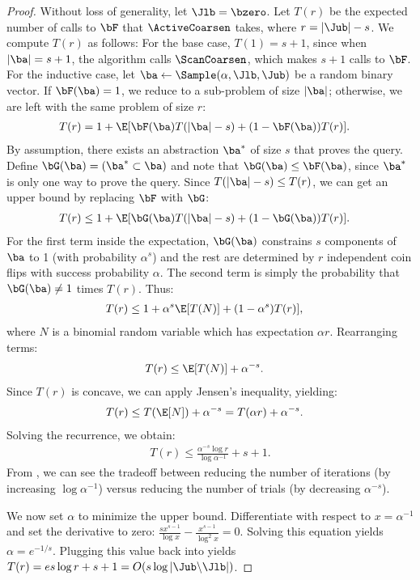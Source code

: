 \begin{proof}
Without loss of generality, let $\Jlb = \bzero$.
Let $T(r)$ be the expected number of calls to $\bF$
that $\ActiveCoarsen$ takes, where $r = |\Jub| - s$.
We compute $T(r)$ as follows:
For the base case, $T(1) = s+1$,
since when $|\ba| = s+1$, the algorithm calls $\ScanCoarsen$, which makes $s+1$ calls to $\bF$.
For the inductive case,
let $\ba \leftarrow \Sample(\alpha, \Jlb, \Jub)$ be a random binary vector.
If $\bF(\ba) = 1$, we reduce to a sub-problem of size $|\ba|$;
otherwise, we are left with the same problem of size $r$:
\begin{align}
T(r) &= 1 + \E[\bF(\ba) T(|\ba|-s) + (1-\bF(\ba)) T(r)].
\end{align}
By assumption, there exists an abstraction $\ba^*$ of size $s$ that proves the query.
Define $\bG(\ba) = (\ba^* \subset \ba)$ and note that $\bG(\ba) \le \bF(\ba)$,
since $\ba^*$ is only one way to prove the query.
Since $T(|\ba|-s) \le T(r)$,
we can get an upper bound by replacing $\bF$ with $\bG$:
\begin{align}
T(r) &\le 1 + \E[\bG(\ba) T(|\ba|-s) + (1-\bG(\ba)) T(r)].
\end{align}
For the first term inside the expectation, $\bG(\ba)$ constrains $s$ components of $\ba$ to 1 (with probability $\alpha^s$)
and the rest are determined by $r$ independent coin flips with success probability $\alpha$.
The second term is simply the probability that $\bG(\ba) \neq 1$ times $T(r)$.
Thus:
\begin{align}
T(r) &\le 1 + \alpha^s \E[T(N)] + (1-\alpha^s) T(r)],
\end{align}
where $N$ is a binomial random variable which has expectation $\alpha r$.
Rearranging terms:
\begin{align}
T(r) &\le \E[T(N)] + \alpha^{-s}.
\end{align}
Since $T(r)$ is concave, we can apply Jensen's inequality, yielding:
\begin{align}
T(r) &\le T(\E[N]) + \alpha^{-s} = T(\alpha r) + \alpha^{-s}.
\end{align}
Solving the recurrence, we obtain:
\begin{align}
\label{eqn:Tr}
T(r) \le \frac{\alpha^{-s} \log r}{\log \alpha^{-1}} + s+1.
\end{align}
From , we can see the tradeoff between reducing the
number of iterations (by increasing $\log \alpha^{-1}$)
versus reducing the number of trials (by decreasing $\alpha^{-s}$).

We now set $\alpha$ to minimize the upper bound.
Differentiate with respect to $x = \alpha^{-1}$ and set the derivative to zero:
$\frac{s x^{s-1}}{\log x} - \frac{x^{s-1}}{\log^2 x} = 0$.
Solving this equation yields $\alpha = e^{-1/s}$.
Plugging this value back into  yields
$T(r) = e s \log r + s+1 = O(s \log |\Jub\backslash\Jlb|)$.
\end{proof}

